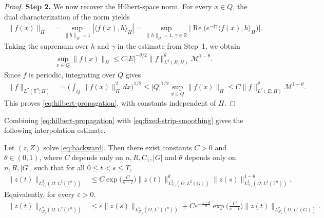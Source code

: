 \documentclass[print,wide]{draft}
\begin{document}
\begin{proof}
\textbf{Step 2.} We now recover the Hilbert-space norm.
For every \(x\in Q\), the dual characterization of the norm yields
\begin{align*}
\|f(x)\|_H
&=\sup_{\|h\|_H=1}|\langle f(x),h\rangle_H|
=\sup_{\|h\|_H=1,\,\gamma\in\mathbb R}
\bigl|\operatorname{Re}\bigl(e^{-\mathrm{i}\gamma}\langle f(x),h\rangle_H\bigr)\bigr|.
\end{align*}
Taking the supremum over \(h\) and \(\gamma\) in the estimate from Step~1, we obtain
\begin{align*}
\sup_{x\in Q}\|f(x)\|_H
\leq C|E|^{-\theta/2}
\|f\|_{L^2(E;H)}^\theta\mathcal M^{1-\theta}.
\end{align*}
Since \(f\) is periodic, integrating over \(Q\) gives
\begin{align*}
\|f\|_{L^2(\mathbb T^n;H)}
&=\biggl(\int_Q\|f(x)\|_H^2\,dx\biggr)^{1/2}\leq |Q|^{1/2}\sup_{x\in Q}\|f(x)\|_H
\leq C\|f\|_{L^2(E;H)}^\theta\mathcal M^{1-\theta}.
\end{align*}
This proves \eqref{eq:hilbert-propagation}, with constants independent of \(H\).
\end{proof}




Combining \eqref{eq:hilbert-propagation} with \eqref{eq:fixed-strip-smoothing}
gives the following interpolation estimate.
%
\begin{corollary}\label{cor:one-time-interpolation}
Let \((z,Z)\) solve \eqref{eq:backward}. Then there exist constants \(C>0\) and \(\theta\in(0,1)\), where \(C\) depends only on \(n,R,C_1,|G|\) and \(\theta\) depends only on \(n,R,|G|\), such that for all \(0\le t<s\le T\),
\begin{align}\label{eq:one-time-multiplicative}
\lVert z(t)\rVert_{L^2_{\mathcal{F}_t}(\Omega;L^2(\mathbb{T}^n))}
&\leq C\exp\biggl(\frac{C}{s-t}\biggr)
\lVert z(t)\rVert_{L^2_{\mathcal{F}_t}(\Omega;L^2(G))}^\theta
\lVert z(s)\rVert_{L^2_{\mathcal{F}_s}(\Omega;L^2(\mathbb{T}^n))}^{1-\theta}.
\end{align}
Equivalently, for every \(\varepsilon>0\),
\begin{align}\label{eq:one-time-epsilon}
\lVert z(t)\rVert_{L^2_{\mathcal{F}_t}(\Omega;L^2(\mathbb{T}^n))}
&\leq \varepsilon
\lVert z(s)\rVert_{L^2_{\mathcal{F}_s}(\Omega;L^2(\mathbb{T}^n))}
+C\varepsilon^{-\frac{1-\theta}{\theta}}
\exp\biggl(\frac{C}{s-t}\biggr)
\lVert z(t)\rVert_{L^2_{\mathcal{F}_t}(\Omega;L^2(G))}.
\end{align}
\end{corollary}
%
\end{document}
